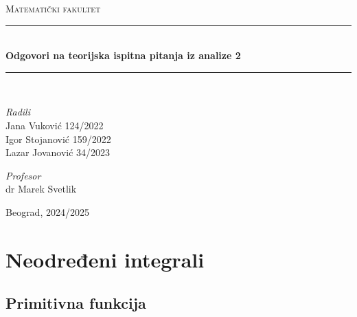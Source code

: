 \documentclass{article}
\begin{document}
\begin{titlepage}

    \newcommand{\HRule}{\rule{\linewidth}{0.4mm}}
    \center
    \textsc{\LARGE Matematički fakultet}\\[5cm]

    \HRule\\[0.4cm]
    {\LARGE\bfseries Odgovori na teorijska ispitna pitanja iz analize 2}
    \\[0.2cm]
    \HRule\\[2cm]

    \vspace{17\baselineskip}
    \begin{minipage}[t]{0.4\textwidth}
        \begin{flushleft}
            \large
            \textit{Radili}\\
            Jana Vuković 124/2022\\
            Igor Stojanović 159/2022\\
            Lazar Jovanović 34/2023
        \end{flushleft}
    \end{minipage}
    \hspace*{1cm}
    \begin{minipage}[t]{0.4\textwidth}
        \begin{flushright}
            \large
            \textit{Profesor}\\
            dr Marek Svetlik
        \end{flushright}
    \end{minipage}

    \vfill\vfill\vfill\vfill
    {\large Beograd, 2024/2025}
    \vfill

\end{titlepage}

\renewcommand{\contentsname}{Sadržaj}
\tableofcontents

\newpage

\section{Neodređeni integrali}
\subsection{Primitivna funkcija}
\end{document}
